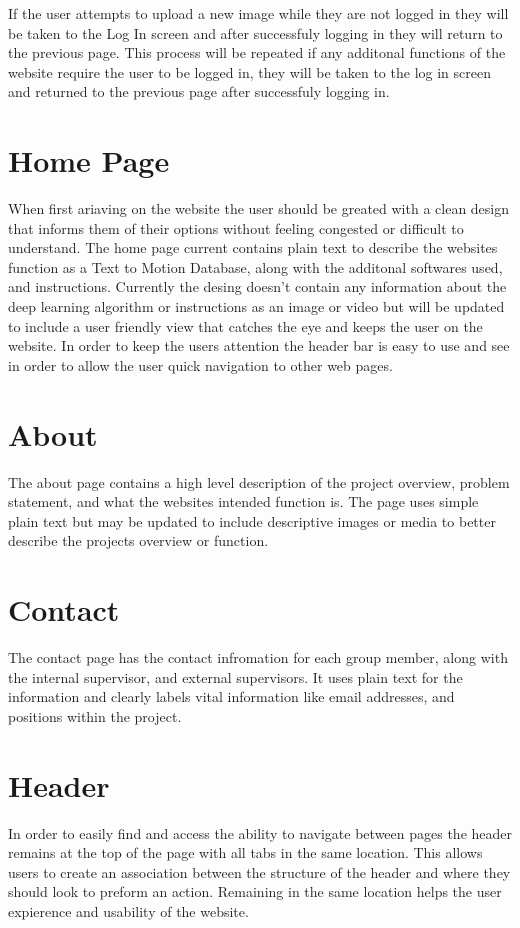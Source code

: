 \documentclass{scrreprt}
\begin{document}
If the user attempts to upload a new image while they are not logged in they will be taken to the Log In screen and after successfuly logging in they will return to the previous page. This process will be repeated if any additonal functions of the website require the user to be logged in, they will be taken to the log in screen and returned to the previous page after successfuly logging in.

\section{Home Page}
When first ariaving on the website the user should be greated with a clean design that informs them of their options without feeling congested or difficult to understand. The home page current contains plain text to describe the websites function as a Text to Motion Database, along with the additonal softwares used, and instructions. Currently the desing doesn't contain any information about the deep learning algorithm or instructions as an image or video but will be updated to include a user friendly view that catches the eye and keeps the user on the website. In order to keep the users attention the header bar is easy to use and see in order to allow the user quick navigation to other web pages.

\section{About}
The about page contains a high level description of the project overview, problem statement, and what the websites intended function is. The page uses simple plain text but may be updated to include descriptive images or media to better describe the projects overview or function.

\section{Contact}
The contact page has the contact infromation for each group member, along with the internal supervisor, and external supervisors. It uses plain text for the information and clearly labels vital information like email addresses, and positions within the project.

\section{Header}
In order to easily find and access the ability to navigate between pages the header remains at the top of the page with all tabs in the same location. This allows users to create an association between the structure of the header and where they should look to preform an action. Remaining in the same location helps the user expierence and usability of the website.
\end{document}
